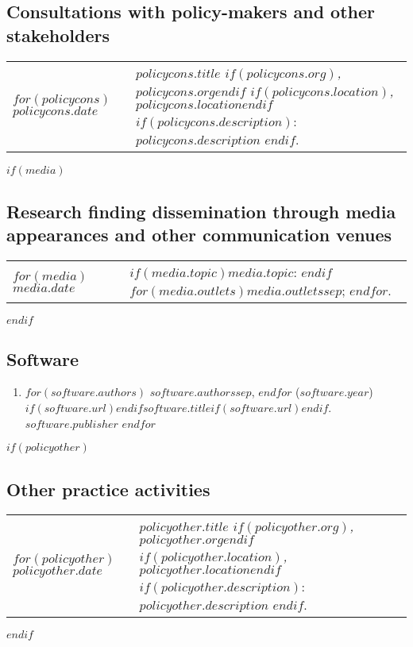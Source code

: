 \documentclass[martgin, line]{article}
\begin{document}
\subsection*{Consultations with policy-makers and other
  stakeholders}

\setlength{\extrarowheight}{.75em}
\begin{longtable}[l]{lp{5in}}   
$for(policycons)$
$policycons.date$&
\parbox[t]{5in}{
    \textit{$policycons.title$%
    $if(policycons.org)$, $policycons.org$$endif$%
    $if(policycons.location)$, $policycons.location$$endif$}%
    $if(policycons.description)$: %
    $policycons.description$%
    $endif$.%
  }\\
$endfor$
\end{longtable}
\setlength{\extrarowheight}{0em}

$if(media)$
\subsection*{Research finding dissemination through media appearances
  and other communication venues}

\setlength{\extrarowheight}{.75em}
\begin{longtable}[l]{lp{5in}}   
$for(media)$
$media.date$&
\parbox[t]{5in}{
    $if(media.topic)$$media.topic$: $endif$%
    $for(media.outlets)$$media.outlets$$sep$; $endfor$.%
  }\\
$endfor$
\end{longtable}
\setlength{\extrarowheight}{0em}
$endif$


\subsection*{Software}

\begin{enumerate}
  $for(software)$
  \item
  $for(software.authors)$
  $software.authors$$sep$,
  $endfor$
  ($software.year$)
  $if(software.url)$\href{$software.url$}{$endif$$software.title$$if(software.url)$}$endif$.
  $software.publisher$
  $endfor$
\end{enumerate}

$if(policyother)$
\subsection*{Other practice activities}

\setlength{\extrarowheight}{.75em}
\begin{longtable}[l]{lp{5in}}   
$for(policyother)$
$policyother.date$&
\parbox[t]{5in}{
    \textit{$policyother.title$%
    $if(policyother.org)$, $policyother.org$$endif$%
    $if(policyother.location)$, $policyother.location$$endif$}%
    $if(policyother.description)$: %
    $policyother.description$%
    $endif$.%
  }\\
$endfor$
\end{longtable}
\setlength{\extrarowheight}{0em}
$endif$
\end{document}
